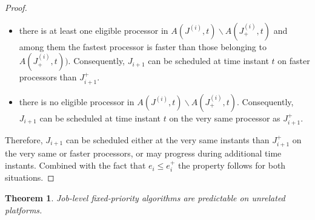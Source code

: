 \documentclass[a4paper,11pt]{article}
\newtheorem{Theorem}{Theorem}
\begin{document}
\begin{proof}
  \begin{itemize}
  \item there is at least one eligible processor in $A(J^{(i)},t)
    \backslash A(J^{(i)}_{+},t)$ and among them the fastest processor
    is faster than those belonging to $ A(J^{(i)}_{+},t))$. Consequently,
    $J_{i+1}$ can be scheduled at time instant $t$ on faster
    processors than $J_{i+1}^{+}$.
  \item there is no eligible processor in $A(J^{(i)},t) \backslash
    A(J^{(i)}_{+},t)$. Consequently, $J_{i+1}$ can be scheduled at time
    instant $t$ on the very same processor as $J_{i+1}^{+}$.
 \end{itemize}

 Therefore, $J_{i+1}$ can be scheduled either at the very same instants
 than $J_{i+1}^{+}$ on the very same or faster processors, or may
 progress during additional time instants. Combined with the fact that
 $e_{i}\leq e_{i}^+$ the property follows for both situations.
\end{proof}

\begin{Theorem} \label{thNotWorkPred} Job-level fixed-priority algorithms are predictable on unrelated platforms.
\end{Theorem}
\end{document}
